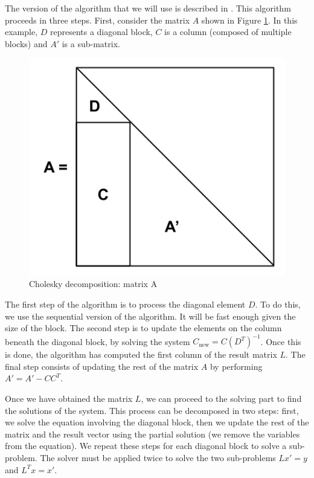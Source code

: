 The version of the algorithm that we will use is described in
\cite{choleskyblock}. This algorithm proceeds in three steps. First, consider
the matrix $A$ shown in Figure \ref{fig:chodeca}. In this example, $D$
represents a diagonal block, $C$ is a column (composed of multiple blocks) and
$A'$ is a sub-matrix.

\begin{figure}[!ht]
  \begin{center}
    \includegraphics[scale=0.4]{img/cho-img/cho_block_dec_A.png}
    \caption{Cholesky decomposition: matrix A}
    \label{fig:chodeca}
  \end{center}
\end{figure}

The first step of the algorithm is to process the diagonal element $D$. To do
this, we use the sequential version of the algorithm. It will be fast enough
given the size of the block. The second step is to update the elements on the
column beneath the diagonal block, by solving the system $C_{\text{new}} =
C(D^{T})^{-1}$. Once this is done, the algorithm has computed the first column of the
result matrix $L$. The final step consists of updating the rest of the matrix
$A$ by performing $A' = A' - CC^{T}$.

Once we have obtained the matrix $L$, we can proceed to the solving part to find
the solutions of the system. This process can be decomposed in two steps: first,
we solve the equation involving the diagonal block, then we update the rest of
the matrix and the result vector using the partial solution (we remove the
variables from the equation). We repeat these steps for each diagonal block to
solve a sub-problem. The solver must be applied twice to solve the two
sub-problems $Lx' = y$ and $L^{T}x = x'$.

